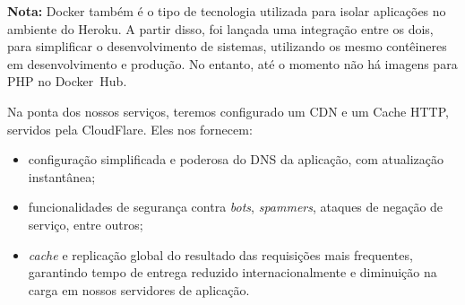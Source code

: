\documentclass[12pt,a4paper,twoside,hyphens,english,brazil]{abntex2}
\begin{document}
{

\begin{minipage}{\linewidth} 
	\begin{framed}
		\textbf{Nota:} Docker também é o tipo de tecnologia utilizada para isolar aplicações no ambiente do Heroku. A partir disso, foi lançada uma integração entre os dois, para simplificar o desenvolvimento de sistemas, utilizando os mesmo contêineres em desenvolvimento e produção.\cite{heroku-docker} No entanto, até o momento não há imagens para PHP no Docker~Hub\cite{heroku-dockerhub}\cite{heroku-docker-php}.
		
	\end{framed}
\end{minipage}

\vspace{0.5cm}
Na ponta dos nossos serviços, teremos configurado um CDN e um Cache HTTP, servidos pela CloudFlare. Eles nos fornecem:
\begin{itemize}
	\item configuração simplificada e poderosa do DNS da aplicação, com atualização instantânea;
	\item funcionalidades de segurança contra \emph{bots}, \emph{spammers}, ataques de negação de serviço, entre outros;
	\item \emph{cache} e replicação global do resultado das requisições mais frequentes, garantindo tempo de entrega reduzido internacionalmente e diminuição na carga em nossos servidores de aplicação.
\end{itemize}

}
\end{document}
